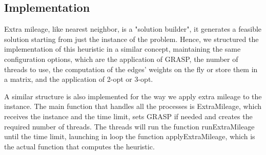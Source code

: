 \subsection{Implementation}
Extra mileage, like nearest neighbor, is a "solution builder", it generates a feasible solution starting from just the 
instance of the problem. Hence, we structured the implementation of this heuristic in a similar concept, maintaining the 
same configuration options, which are the application of GRASP, the number of threads to use, the computation of the edges' 
weights on the fly or store them in a matrix, and the application of 2-opt or 3-opt.

A similar structure is also implemented for the way we apply extra mileage to the instance. The main function that handles 
all the processes is ExtraMileage, which receives the instance and the time limit, sets GRASP if needed and creates the 
required number of threads.
The threads will run the function runExtraMileage until the time limit, launching in loop the function applyExtraMileage, 
which is the actual function that computes the heuristic.
